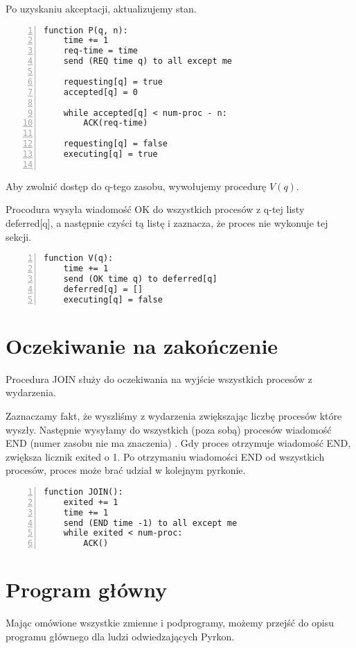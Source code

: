 \documentclass[11pt]{article}
\begin{document}
Po uzyskaniu akceptacji, aktualizujemy stan.

\begin{Verbatim}[numbers=left,xleftmargin=5mm]
function P(q, n):
    time += 1
    req-time = time
    send (REQ time q) to all except me
    
    requesting[q] = true
    accepted[q] = 0
    
    while accepted[q] < num-proc - n:
        ACK(req-time)
        
    requesting[q] = false
    executing[q] = true
    
\end{Verbatim}

Aby zwolnić dostęp do q-tego zasobu, wywołujemy procedurę $V(q)$.

Procodura wysyła wiadomość OK do wszystkich procesów z q-tej listy deferred[q],
a następnie czyści tą listę i zaznacza, że proces nie wykonuje tej sekcji.

\begin{Verbatim}[numbers=left,xleftmargin=5mm]
function V(q):
    time += 1
    send (OK time q) to deferred[q]
    deferred[q] = []
    executing[q] = false
\end{Verbatim}

\section{Oczekiwanie na zakończenie}

Procedura JOIN służy do oczekiwania na wyjście wszystkich procesów z wydarzenia.

Zaznaczamy fakt, że wyszliśmy z wydarzenia zwiększając liczbę procesów które wyszły.
Następnie wysyłamy do wszystkich (poza sobą) procesów wiadomość END (numer zasobu nie ma znaczenia) .
Gdy proces otrzymuje wiadomość END, zwiększa licznik exited o 1.
Po otrzymaniu wiadomości END od wszystkich procesów,
proces może brać udział w kolejnym pyrkonie.

\begin{Verbatim}[numbers=left,xleftmargin=5mm]
function JOIN():
    exited += 1
    time += 1
    send (END time -1) to all except me
    while exited < num-proc:
        ACK()
\end{Verbatim}

\section{Program główny}

Mając omówione wszystkie zmienne i podprogramy, możemy przejść do opisu programu głównego dla ludzi odwiedzających Pyrkon.
\end{document}
